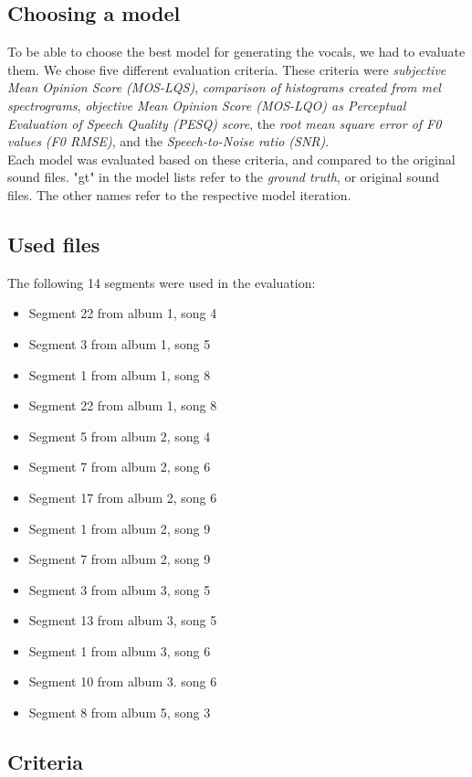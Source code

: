 \documentclass[a4paper]{article}
\begin{document}
\subsection{Choosing a model}

To be able to choose the best model for generating the vocals, we had to
evaluate them. We chose five different evaluation criteria. These criteria were
\emph{subjective Mean Opinion Score (MOS-LQS)}, \emph{comparison of histograms
    created from mel spectrograms}, \emph{objective Mean Opinion Score (MOS-LQO) as
    Perceptual Evaluation of Speech Quality (PESQ) score}, the \emph{root mean
    square error of F0 values (F0 RMSE)}, and the \emph{Speech-to-Noise ratio
    (SNR)}. \\
Each model was evaluated based on these criteria, and compared to the original
sound files. "gt" in the model lists refer to the \emph{ground truth}, or
original sound files. The other names refer to the respective model iteration.

\subsection{Used files}
The following 14 segments were used in the evaluation:
\begin{itemize}
    \item Segment 22 from album 1, song 4
    \item Segment 3 from album 1, song 5
    \item Segment 1 from album 1, song 8
    \item Segment 22 from album 1, song 8
    \item Segment 5 from album 2, song 4
    \item Segment 7 from album 2, song 6
    \item Segment 17 from album 2, song 6
    \item Segment 1 from album 2, song 9
    \item Segment 7 from album 2, song 9
    \item Segment 3 from album 3, song 5
    \item Segment 13 from album 3, song 5
    \item Segment 1 from album 3, song 6
    \item Segment 10 from album 3. song 6
    \item Segment 8 from album 5, song 3
\end{itemize}

\subsection{Criteria}
\end{document}
